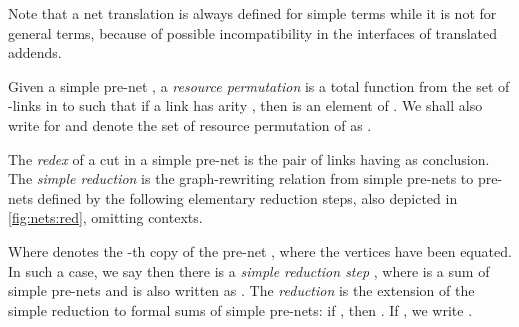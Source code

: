 Note that a net translation is always defined for simple terms while it is 
not for general terms, because of possible incompatibility in the interfaces of 
translated addends.

\begin{definition}\label{def:RIN:permnet}
Given a simple pre-net , a \textit{resource permutation}  
is a total function from the set of -links in  to  such that
if a link  has arity ,
  then  is an element  of .
We shall also write  for  and denote the set of 
resource permutation of  as .
\end{definition}

\begin{definition}\label{def:nets:red}
The \textit{redex} of a cut  in a simple pre-net is the pair of links having 
 as conclusion.
The \textit{simple reduction}  is the graph-rewrit\-ing relation from 
simple pre-nets to pre-nets defined by the following elementary reduction steps,
also depicted in \autoref{fig:nets:red}, omitting contexts.

Where  denotes the -th copy of the pre-net ,
where the vertices  have been equated.
In such a case, we say then there is a \textit{simple reduction step} , where  is a sum of simple pre-nets and is 
also written as .
The \textit{reduction} is the extension of the simple reduction to formal sums 
of simple pre-nets: if
  ,
then
  .
If
  ,
we write .
\end{definition}

